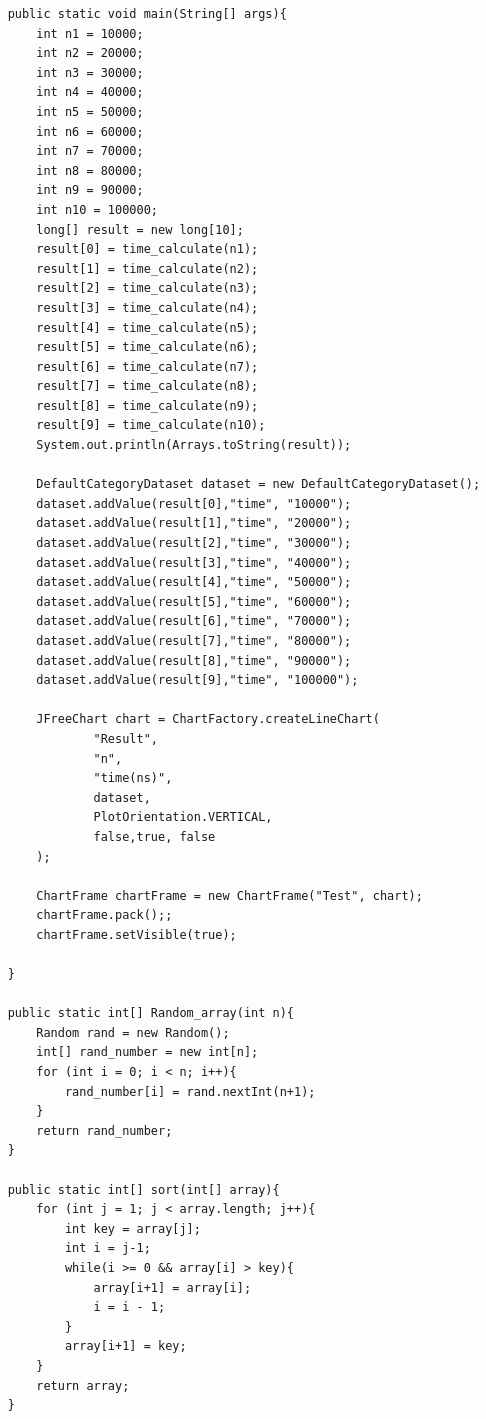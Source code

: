 \documentclass{article}
\newenvironment{sol}[1][Solution]{\begin{trivlist}\item[\hskip\labelsep {\bfseries #1:}]}{\end{trivlist}}
\begin{document}
\begin{enumerate}
\begin{sol}
\begin{enumerate}
\begin{verbatim}
    public static void main(String[] args){
        int n1 = 10000;
        int n2 = 20000;
        int n3 = 30000;
        int n4 = 40000;
        int n5 = 50000;
        int n6 = 60000;
        int n7 = 70000;
        int n8 = 80000;
        int n9 = 90000;
        int n10 = 100000;
        long[] result = new long[10];
        result[0] = time_calculate(n1);
        result[1] = time_calculate(n2);
        result[2] = time_calculate(n3);
        result[3] = time_calculate(n4);
        result[4] = time_calculate(n5);
        result[5] = time_calculate(n6);
        result[6] = time_calculate(n7);
        result[7] = time_calculate(n8);
        result[8] = time_calculate(n9);
        result[9] = time_calculate(n10);
        System.out.println(Arrays.toString(result));

        DefaultCategoryDataset dataset = new DefaultCategoryDataset();
        dataset.addValue(result[0],"time", "10000");
        dataset.addValue(result[1],"time", "20000");
        dataset.addValue(result[2],"time", "30000");
        dataset.addValue(result[3],"time", "40000");
        dataset.addValue(result[4],"time", "50000");
        dataset.addValue(result[5],"time", "60000");
        dataset.addValue(result[6],"time", "70000");
        dataset.addValue(result[7],"time", "80000");
        dataset.addValue(result[8],"time", "90000");
        dataset.addValue(result[9],"time", "100000");

        JFreeChart chart = ChartFactory.createLineChart(
                "Result",
                "n",
                "time(ns)",
                dataset,
                PlotOrientation.VERTICAL,
                false,true, false
        );

        ChartFrame chartFrame = new ChartFrame("Test", chart);
        chartFrame.pack();;
        chartFrame.setVisible(true);

    }

    public static int[] Random_array(int n){
        Random rand = new Random();
        int[] rand_number = new int[n];
        for (int i = 0; i < n; i++){
            rand_number[i] = rand.nextInt(n+1);
        }
        return rand_number;
    }

    public static int[] sort(int[] array){
        for (int j = 1; j < array.length; j++){
            int key = array[j];
            int i = j-1;
            while(i >= 0 && array[i] > key){
                array[i+1] = array[i];
                i = i - 1;
            }
            array[i+1] = key;
        }
        return array;
    }


\end{verbatim}
\end{enumerate}
\end{sol}
\end{enumerate}
\end{document}
